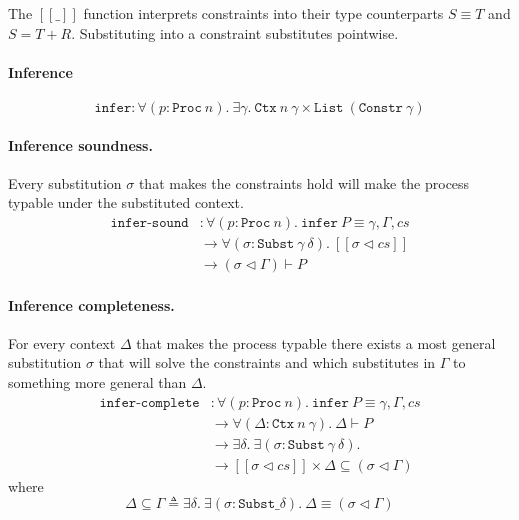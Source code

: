 \documentclass[sigplan,screen,review]{acmart}
\begin{document}
The \([\![\_]\!]\) function interprets constraints into their type
counterparts \(S \equiv T\) and \(S = T + R\). Substituting into a
constraint substitutes pointwise.

\paragraph{Inference}

\[
\texttt{infer} : \forall (p : \texttt{Proc}~n). ~ \exists \gamma. ~ \texttt{Ctx}~n~\gamma \times \texttt{List}~(\texttt{Constr}~\gamma)
\]

\paragraph{Inference soundness.}

Every substitution \(\sigma\) that makes the constraints hold will make
the process typable under the substituted context. \[
\begin{aligned}
\texttt{infer-sound} &: \forall (p : \texttt{Proc}~n). ~ \texttt{infer}~P \equiv \gamma , \Gamma , cs \\
&\to \forall (\sigma : \texttt{Subst}~\gamma~\delta). ~ [\![ \sigma \triangleleft cs ]\!] \\
&\to (\sigma \triangleleft \Gamma) \vdash P
\end{aligned}
\]

\paragraph{Inference completeness.}

For every context \(\Delta\) that makes the process typable there exists
a most general substitution \(\sigma\) that will solve the constraints
and which substitutes in \(\Gamma\) to something more general than
\(\Delta\). \[
\begin{aligned}
\texttt{infer-complete} &: \forall (p : \texttt{Proc}~n). ~ \texttt{infer}~P \equiv \gamma , \Gamma , cs \\
&\to \forall (\Delta : \texttt{Ctx}~n~\gamma). ~ \Delta \vdash P \\
&\to \exists \delta. ~ \exists (\sigma : \texttt{Subst}~\gamma~\delta). \\
&\to [\![ \sigma \triangleleft cs ]\!] \times \Delta \subseteq (\sigma \triangleleft \Gamma)
\end{aligned}
\] where \[
\Delta \subseteq \Gamma \triangleq \exists \delta. ~ \exists (\sigma : \texttt{Subst} \_ \delta). ~ \Delta \equiv (\sigma \triangleleft \Gamma)
\]
\end{document}
